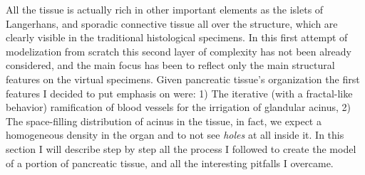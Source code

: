 All the tissue is actually rich in other important elements as the islets of Langerhans, and sporadic connective tissue all over the structure, which are clearly visible in the traditional histological specimens. In this first attempt of modelization from scratch this second layer of complexity has not been already considered, and the main focus has been to reflect only the main structural features on the virtual specimens. Given pancreatic tissue's organization the first features I decided to put emphasis on were: 1) The iterative (with a fractal-like behavior) ramification of blood vessels for the irrigation of glandular acinus, 2) The space-filling distribution of acinus in the tissue, in fact, we expect a homogeneous density in the organ and to not see \textit{holes} at all inside it. In this section I will describe step by step all the process I followed to create the model of a portion of pancreatic tissue, and all the interesting pitfalls I overcame.

\newcommand*{\mycount}{\stepcounter{mycounter}\themycounter}

